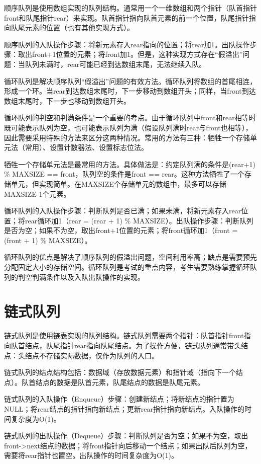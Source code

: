\documentclass[12pt, a4paper]{article}
\begin{document}
顺序队列是使用数组实现的队列结构。通常用一个一维数组和两个指针（队首指针front和队尾指针rear）来实现。队首指针指向队首元素的前一个位置，队尾指针指向队尾元素的位置（也有其他实现方式）。

顺序队列的入队操作步骤：将新元素存入rear指向的位置；将rear加1。出队操作步骤：取出front+1位置的元素；将front加1。但是，这种实现方式存在“假溢出”问题：当队列未满时，rear可能已经到达数组末尾，无法继续入队。

循环队列是解决顺序队列“假溢出”问题的有效方法。循环队列将数组的首尾相连，形成一个环。当rear到达数组末尾时，下一步移动到数组开头；同样，当front到达数组末尾时，下一步也移动到数组开头。

循环队列的判空和判满条件是一个重要的考点。由于循环队列中front和rear相等时既可能表示队列为空，也可能表示队列为满（假设队列满时rear与front也相等），因此需要采用特殊的方法来区分这两种情况。常用的方法有三种：牺牲一个存储单元法（常用）、设置计数器法、设置标志位法。

牺牲一个存储单元法是最常用的方法。具体做法是：约定队列满的条件是(rear+1) \% MAXSIZE == front，队列空的条件是front == rear。这种方法牺牲了一个存储单元，但实现简单。在MAXSIZE个存储单元的数组中，最多可以存储MAXSIZE-1个元素。

循环队列的入队操作步骤：判断队列是否已满；如果未满，将新元素存入rear位置；将rear循环加1（rear = (rear + 1) \% MAXSIZE）。出队操作步骤：判断队列是否为空；如果不为空，取出front+1位置的元素；将front循环加1（front = (front + 1) \% MAXSIZE）。

循环队列的优点是解决了顺序队列的假溢出问题，空间利用率高；缺点是需要预先分配固定大小的存储空间。循环队列是考试的重点内容，考生需要熟练掌握循环队列的判空判满条件以及入队出队操作的实现。

\section{链式队列}

链式队列是使用链表实现的队列结构。链式队列需要两个指针：队首指针front指向队首结点，队尾指针rear指向队尾结点。为了操作方便，链式队列通常带头结点：头结点不存储实际数据，仅作为队列的入口。

链式队列的结点结构包括：数据域（存放数据元素）和指针域（指向下一个结点）。队首结点的数据是队首元素，队尾结点的数据是队尾元素。

链式队列的入队操作（Enqueue）步骤：创建新结点；将新结点的指针置为NULL；将rear结点的指针指向新结点；更新rear指针指向新结点。入队操作的时间复杂度为O(1)。

链式队列的出队操作（Dequeue）步骤：判断队列是否为空；如果不为空，取出front->next结点的数据；将front指针向后移动一个结点；如果出队后队列为空，需要将rear指针也置空。出队操作的时间复杂度为O(1)。
\end{document}

